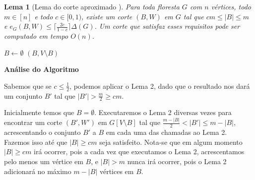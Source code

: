 \documentclass[a4paper,12pt]{article}
\newtheorem{lem}{Lema}
\begin{document}
\bigskip
\bigskip
\bigskip
\bigskip
\bigskip
\bigskip
\bigskip
\bigskip


\begin{lem}[Lema do corte aproximado {\cite[Lemma 3]{Schmidt15}}]

	Para toda floresta $G$ com $n$ vértices, todo $m \in [n]$
	e todo $c \in [0,1)$,
	existe um corte $(B,W)$ em $G$ tal que 
	$cm \le |B| \le m$ e
	$e_G(B,W) \le \lceil \frac{2c}{1-c}\rceil \Delta(G)$.
	Um corte que satisfaz esses requisitos pode ser computado em
	tempo $O(n)$.
\end{lem}

\medskip
\medskip

\begin{algorithm}[H]

	\caption{Computa corte aproximado em uma floresta}
	$B \gets \emptyset$\;
	{
	}
	\Return $(B,V\setminus B)$

\end{algorithm}	

\bigskip
\bigskip

\textbf{Análise do Algoritmo}

	Sabemos que se $c \le \frac{1}{2}$, podemos aplicar o Lema 2, 
	dado que o resultado nos dará um conjunto $B'$ tal que
	$|B'|>\frac{m}{2}\ge cm$.

	Inicialmente temos que $B = \emptyset$.
	Executaremos o Lema 2 diversas vezes para encontrar 
	um corte $(B',W')$ em $G[V\setminus B]$ tal que $\frac{m-|B|}{2}<|B'|\le m-|B|$,
	acrescentando o conjunto $B'$ a $B$ em cada uma das chamadas ao Lema 2.
	Fazemos isso até que $|B|\ge cm$ seja satisfeito.
	Nota-se que em algum momento $|B|\ge cm$ irá ocorrer, pois a cada vez
	que executamos o Lema 2, acrescentamos pelo menos um vértice em $B$,
	e $|B|>m$ nunca irá ocorrer, pois o Lema 2 adicionará no máximo 
	$m-|B|$ vértices em $B$.
\end{document}
